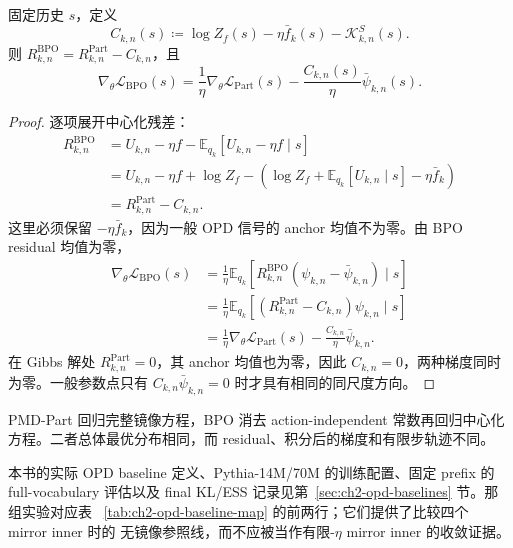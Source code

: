 \begin{proposition}
\label{prop:ch2-bpo-part-gradient-gap}
固定历史 $s$，定义
\begin{equation}
C_{k,n}(s)\coloneqq\log Z_f(s)-\eta\bar f_k(s)-\mathcal K_{k,n}^{S}(s).
\label{eq:ch2-bpo-part-qc}
\end{equation}
则 $R_{k,n}^{\mathrm{BPO}}=R_{k,n}^{\mathrm{Part}}-C_{k,n}$，且
\begin{equation}
\nabla_\theta\mathcal L_{\mathrm{BPO}}(s)
=\frac1\eta\nabla_\theta\mathcal L_{\mathrm{Part}}(s)
-\frac{C_{k,n}(s)}\eta\bar\psi_{k,n}(s).
\label{eq:ch2-bpo-part-gradient-gap}
\end{equation}
\end{proposition}
\begin{proof}
逐项展开中心化残差：
\begin{align*}
R_{k,n}^{\mathrm{BPO}}
&=U_{k,n}-\eta f-\mathbb E_{ q_k}[U_{k,n}-\eta f\mid s]\\
&=U_{k,n}-\eta f+\log Z_f
-\left(\log Z_f+\mathbb E_{ q_k}[U_{k,n}\mid s]-\eta\bar f_k\right)\\
&=R_{k,n}^{\mathrm{Part}}-C_{k,n}.
\end{align*}
这里必须保留 $-\eta\bar f_k$，因为一般 OPD 信号的 anchor 均值不为零。由 BPO residual 均值为零，
\begin{align*}
\nabla_\theta\mathcal L_{\mathrm{BPO}}(s)
&=\frac1\eta\mathbb E_{ q_k}[R_{k,n}^{\mathrm{BPO}}(\psi_{k,n}-\bar\psi_{k,n})\mid s]\\
&=\frac1\eta\mathbb E_{ q_k}[(R_{k,n}^{\mathrm{Part}}-C_{k,n})\psi_{k,n}\mid s]\\
&=\frac1\eta\nabla_\theta\mathcal L_{\mathrm{Part}}(s)-\frac{C_{k,n}}\eta\bar\psi_{k,n}.
\end{align*}
在 Gibbs 解处 $R_{k,n}^{\mathrm{Part}}=0$，其 anchor 均值也为零，因此 $C_{k,n}=0$，两种梯度同时为零。一般参数点只有 $C_{k,n}\bar\psi_{k,n}=0$ 时才具有相同的同尺度方向。
\end{proof}

PMD-Part 回归完整镜像方程，BPO 消去 action-independent 常数再回归中心化方程。二者总体最优分布相同，而 residual、积分后的梯度和有限步轨迹不同。

本书的实际 OPD baseline 定义、Pythia-14M/70M 的训练配置、固定 prefix 的 full-vocabulary
评估以及 final KL/ESS 记录见第~\ref{sec:ch2-opd-baselines} 节。那组实验对应表
~\ref{tab:ch2-opd-baseline-map} 的前两行；它们提供了比较四个 mirror inner 时的
无镜像参照线，而不应被当作有限-$\eta$ mirror inner 的收敛证据。

